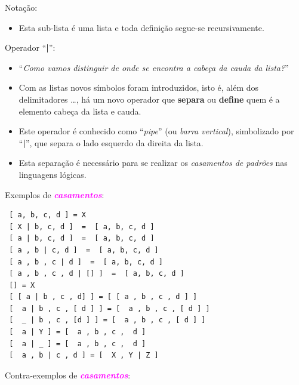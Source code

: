 \begin{frame}[fragile, allowframebreaks=0.9]
\begin{block}{Notação:}
\begin{itemize}
\item   Esta sub-lista é uma lista e toda definição segue-se recursivamente.
 \end{itemize} 

\end{block}


\framebreak
\begin{block}{Operador ``{\bf |}'':}

\begin{itemize}
  \item ``{\em  Como vamos distinguir de onde se encontra
a cabeça  da cauda da lista?}'' 

  \item Com as listas novos símbolos foram introduzidos, 
isto é, além dos delimitadores \lbrack \ldots \rbrack, há um 
 novo operador que \textbf{separa} 
 ou \textbf{define} quem é a elemento cabeça da lista e  cauda. 

  \item Este operador é conhecido como
 ``{\em pipe}'' (ou \textit{barra vertical}), simbolizado por ``{\bf |}'', que 
 separa  o lado esquerdo  da direita da lista. 
 
  \item  Esta separação  é necessário para se realizar os 
  \textit{casamentos de padrões} nas linguagens lógicas.

\end{itemize}
\end{block}

\framebreak
\begin{block}{Exemplos de \textcolor{magenta}{{\em \textbf{casamentos}}}:}

\begin{footnotesize}
\begin{verbatim}
 [ a, b, c, d ] = X
 [ X | b, c, d ]  =  [ a, b, c, d ]
 [ a | b, c, d ]  =  [ a, b, c, d ]
 [ a , b | c, d ]  =  [ a, b, c, d ]
 [ a , b , c | d ]  =  [ a, b, c, d ]
 [ a , b , c , d | [] ]  =  [ a, b, c, d ]
 [] = X
 [ [ a | b , c , d] ] = [ [ a , b , c , d ] ]
 [  a | b , c , [ d ] ] = [  a , b , c , [ d ] ]
 [  _ | b , c , [d ] ] = [  a , b , c , [ d ] ]
 [  a | Y ] = [  a , b , c ,  d ]
 [  a | _ ] = [  a , b , c ,  d ]
 [  a , b | c , d ] = [  X , Y | Z ]
 \end{verbatim}
\end{footnotesize}
\end{block}

\framebreak
\begin{block}{Contra-exemplos de \textcolor{magenta}{{\em \textbf{casamentos}}}:}


\end{block}
\end{frame}
